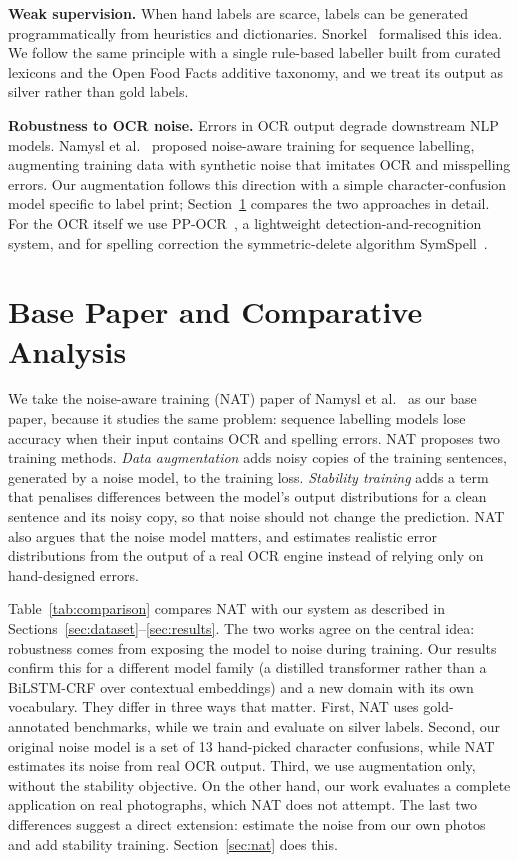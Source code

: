 \documentclass[conference]{IEEEtran}
\begin{document}
\textbf{Weak supervision.} When hand labels are scarce, labels can be generated programmatically from heuristics and dictionaries. Snorkel~\cite{snorkel} formalised this idea. We follow the same principle with a single rule-based labeller built from curated lexicons and the Open Food Facts additive taxonomy, and we treat its output as silver rather than gold labels.

\textbf{Robustness to OCR noise.} Errors in OCR output degrade downstream NLP models. Namysl et al.~\cite{namysl2020nat} proposed noise-aware training for sequence labelling, augmenting training data with synthetic noise that imitates OCR and misspelling errors. Our augmentation follows this direction with a simple character-confusion model specific to label print; Section~\ref{sec:comparison} compares the two approaches in detail. For the OCR itself we use PP-OCR~\cite{ppocr}, a lightweight detection-and-recognition system, and for spelling correction the symmetric-delete algorithm SymSpell~\cite{symspell}.

\section{Base Paper and Comparative Analysis}
\label{sec:comparison}

We take the noise-aware training (NAT) paper of Namysl et al.~\cite{namysl2020nat} as our base paper, because it studies the same problem: sequence labelling models lose accuracy when their input contains OCR and spelling errors. NAT proposes two training methods. \emph{Data augmentation} adds noisy copies of the training sentences, generated by a noise model, to the training loss. \emph{Stability training} adds a term that penalises differences between the model's output distributions for a clean sentence and its noisy copy, so that noise should not change the prediction. NAT also argues that the noise model matters, and estimates realistic error distributions from the output of a real OCR engine instead of relying only on hand-designed errors.

Table~\ref{tab:comparison} compares NAT with our system as described in Sections~\ref{sec:dataset}--\ref{sec:results}. The two works agree on the central idea: robustness comes from exposing the model to noise during training. Our results confirm this for a different model family (a distilled transformer rather than a BiLSTM-CRF over contextual embeddings) and a new domain with its own vocabulary. They differ in three ways that matter. First, NAT uses gold-annotated benchmarks, while we train and evaluate on silver labels. Second, our original noise model is a set of 13 hand-picked character confusions, while NAT estimates its noise from real OCR output. Third, we use augmentation only, without the stability objective. On the other hand, our work evaluates a complete application on real photographs, which NAT does not attempt. The last two differences suggest a direct extension: estimate the noise from our own photos and add stability training. Section~\ref{sec:nat} does this.
\end{document}
